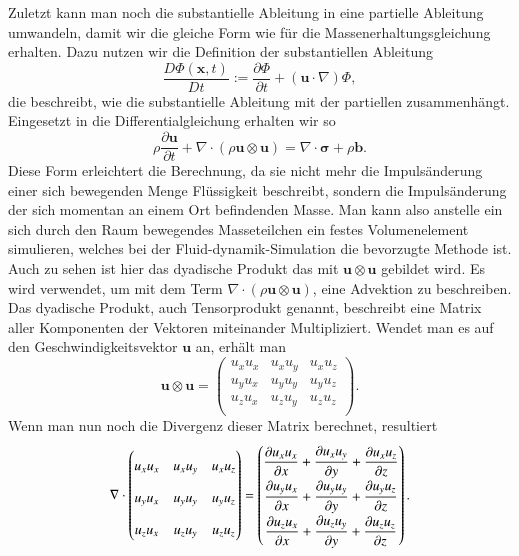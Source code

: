 Zuletzt kann man noch die substantielle Ableitung in eine partielle Ableitung umwandeln, damit wir die gleiche Form wie für die Massenerhaltungsgleichung erhalten.
%
Dazu nutzen wir die Definition der substantiellen Ableitung
\[
\frac{D\Phi(\mathbf{x},t)}{Dt}
:=
\frac{\partial \Phi}{\partial t}+(\mathbf{u}\cdot \nabla)\Phi
,\] 
die beschreibt, wie die substantielle Ableitung mit der partiellen zusammenhängt.
Eingesetzt in die Differentialgleichung erhalten wir so 
\begin{equation}
\label{openfoam:euler2}
\rho\frac{\partial\mathbf{u}}{\partial t} + \nabla \cdot(\rho\mathbf{u}\otimes \mathbf{u})
= 
\nabla \cdot \mathbf{\sigma} +\rho \mathbf{b}.
\end{equation}
Diese Form erleichtert die Berechnung, da sie nicht mehr die Impulsänderung einer sich bewegenden Menge Flüssigkeit beschreibt, sondern die Impulsänderung der sich momentan an einem Ort befindenden Masse. 
Man kann also anstelle ein sich durch den Raum bewegendes Masseteilchen ein festes Volumenelement simulieren, welches bei der Fluid-dynamik-Simulation die bevorzugte Methode ist.
Auch zu sehen ist hier das dyadische Produkt das mit $\mathbf{u}\otimes \mathbf{u}$ gebildet wird.
%
Es wird verwendet, um mit dem Term $\nabla \cdot(\rho\mathbf{u}\otimes \mathbf{u})$, eine Advektion zu beschreiben.
Das dyadische Produkt, auch Tensorprodukt genannt, beschreibt eine Matrix aller Komponenten der Vektoren miteinander Multipliziert.
%
Wendet man es auf den Geschwindigkeitsvektor $\mathbf{u}$ an, erhält man
\begin{equation}
\mathbf{u}\otimes \mathbf{u}
= 
\begin{pmatrix}
	u_x u_x &  u_x u_y & u_x u_z \\
	u_y u_x &  u_y u_y & u_y u_z \\
	u_z u_x &  u_z u_y & u_z u_z \\
\end{pmatrix}
.
\end{equation}
Wenn man nun noch die Divergenz dieser Matrix berechnet, resultiert
\begin{equation}
\nabla \cdot 
\begin{pmatrix}
	u_x u_x &  u_x u_y & u_x u_z \\
	u_y u_x &  u_y u_y & u_y u_z \\
	u_z u_x &  u_z u_y & u_z u_z \\
\end{pmatrix}
= 
\renewcommand{\arraystretch}{1.9}
\begin{pmatrix}
\displaystyle
	\frac{\partial u_x u_x}{\partial x} +  \frac{\partial u_x u_y}{\partial y} + \frac{\partial u_x u_z}{\partial z} \\
\displaystyle
	\frac{\partial u_y u_x}{\partial x} +  \frac{\partial u_y u_y}{\partial y} + \frac{\partial u_y u_z}{\partial z} \\
\displaystyle
	\frac{\partial u_z u_x}{\partial x} +  \frac{\partial u_z u_y}{\partial y} + \frac{\partial u_z u_z}{\partial z}  \\
\end{pmatrix}
.
\end{equation}
